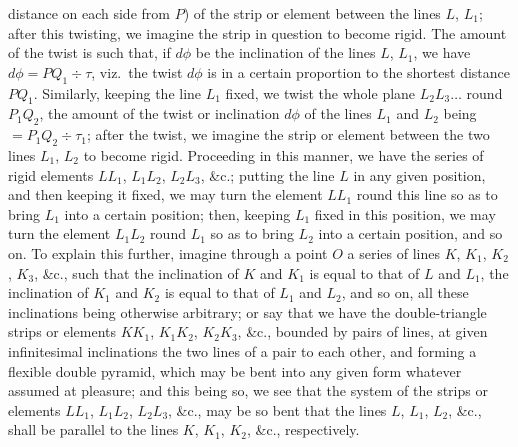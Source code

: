 \documentclass[11pt,a4paper]{article}
\begin{document}
distance on each side from $P$) of the strip or element between the lines $L$, $L_1$; after this twisting, we imagine the strip in question to become rigid. The amount of the twist is such that, if $d\phi$ be the inclination of the lines $L$, $L_1$, we have $d\phi = PQ_1 \div \tau$, viz.\ the twist $d\phi$ is in a certain proportion to the shortest distance $PQ_1$. Similarly, keeping the line $L_1$ fixed, we twist the whole plane $L_2 L_3 \ldots$ round $P_1 Q_2$, the amount of the twist or inclination $d\phi$ of the lines $L_1$ and $L_2$ being $= P_1 Q_2 \div \tau_1$; after the twist, we imagine the strip or element between the two lines $L_1$, $L_2$ to become rigid. Proceeding in this manner, we have the series of rigid elements $LL_1$, $L_1 L_2$, $L_2 L_3$, \&c.; putting the line $L$ in any given position, and then keeping it fixed, we may turn the element $LL_1$ round this line so as to bring $L_1$ into a certain position; then, keeping $L_1$ fixed in this position, we may turn the element $L_1 L_2$ round $L_1$ so as to bring $L_2$ into a certain position, and so on. To explain this further, imagine through a point $O$ a series of lines $K$, $K_1$, $K_2$, $K_3$, \&c., such that the inclination of $K$ and $K_1$ is equal to that of $L$ and $L_1$, the inclination of $K_1$ and $K_2$ is equal to that of $L_1$ and $L_2$, and so on, all these inclinations being otherwise arbitrary; or say that we have the double-triangle strips or elements $KK_1$, $K_1 K_2$, $K_2 K_3$, \&c., bounded by pairs of lines, at given infinitesimal inclinations the two lines of a pair to each other, and forming a flexible double pyramid, which may be bent into any given form whatever assumed at pleasure; and this being so, we see that the system of the strips or elements $LL_1$, $L_1 L_2$, $L_2 L_3$, \&c., may be so bent that the lines $L$, $L_1$, $L_2$, \&c., shall be parallel to the lines $K$, $K_1$, $K_2$, \&c., respectively.
\end{document}

